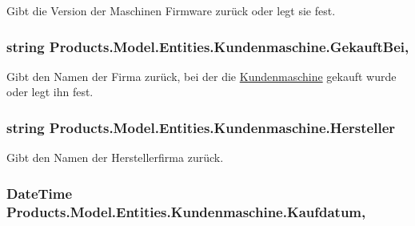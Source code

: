 Gibt die Version der Maschinen Firmware zurück oder legt sie fest. 

\subsubsection[{\texorpdfstring{Gekauft\+Bei}{GekauftBei}}]{\setlength{\rightskip}{0pt plus 5cm}string Products.\+Model.\+Entities.\+Kundenmaschine.\+Gekauft\+Bei\hspace{0.3cm}{\ttfamily [get]}, {\ttfamily [set]}}\hypertarget{class_products_1_1_model_1_1_entities_1_1_kundenmaschine_aa17f9f3ef307173a8f02ffb37120db81}{}\label{class_products_1_1_model_1_1_entities_1_1_kundenmaschine_aa17f9f3ef307173a8f02ffb37120db81}


Gibt den Namen der Firma zurück, bei der die \hyperlink{class_products_1_1_model_1_1_entities_1_1_kundenmaschine}{Kundenmaschine} gekauft wurde oder legt ihn fest. 

\subsubsection[{\texorpdfstring{Hersteller}{Hersteller}}]{\setlength{\rightskip}{0pt plus 5cm}string Products.\+Model.\+Entities.\+Kundenmaschine.\+Hersteller\hspace{0.3cm}{\ttfamily [get]}}\hypertarget{class_products_1_1_model_1_1_entities_1_1_kundenmaschine_ab8e784d9d251ee455c768a525d22bee2}{}\label{class_products_1_1_model_1_1_entities_1_1_kundenmaschine_ab8e784d9d251ee455c768a525d22bee2}


Gibt den Namen der Herstellerfirma zurück. 

\subsubsection[{\texorpdfstring{Kaufdatum}{Kaufdatum}}]{\setlength{\rightskip}{0pt plus 5cm}Date\+Time Products.\+Model.\+Entities.\+Kundenmaschine.\+Kaufdatum\hspace{0.3cm}{\ttfamily [get]}, {\ttfamily [set]}}\hypertarget{class_products_1_1_model_1_1_entities_1_1_kundenmaschine_a66d88d6aa1856be3d9c59820c8e2bb21}{}\label{class_products_1_1_model_1_1_entities_1_1_kundenmaschine_a66d88d6aa1856be3d9c59820c8e2bb21}


